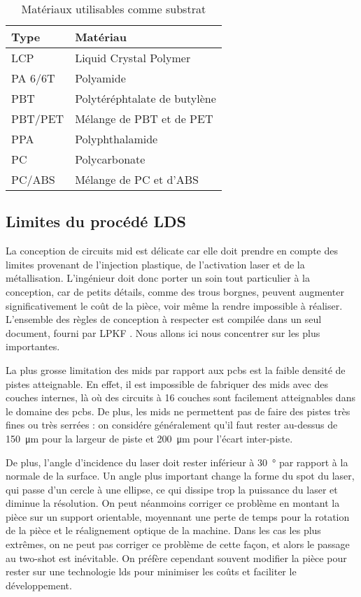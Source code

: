 \begin{table}[h]
\centering
\begin{tabular}{l l}
\toprule 
Type & Matériau \\
\midrule %
LCP & Liquid Crystal Polymer \\
PA 6/6T & Polyamide \\
PBT & Polytéréphtalate de butylène \\
PBT/PET & Mélange de PBT et de PET \\
PPA & Polyphthalamide \\
PC & Polycarbonate \\
PC/ABS & Mélange de PC et d'ABS \\ 
\bottomrule 
\end{tabular}
\caption{Matériaux utilisables comme substrat}
\label{tab:mid-materials}
\end{table}

\subsection{Limites du procédé LDS}
La conception de circuits \gls{mid} est délicate car elle doit prendre en compte des limites provenant de l'injection plastique, de l'activation laser et de la métallisation.
L'ingénieur doit donc porter un soin tout particulier à la conception, car de petits détails, comme des trous borgnes, peuvent augmenter significativement le coût de la pièce, voir même la rendre impossible à réaliser.
L'ensemble des règles de conception à respecter est compilée dans un seul document, fourni par LPKF \cite{mid-design-rules}.
Nous allons ici nous concentrer sur les plus importantes.

La plus grosse limitation des \glspl{mid} par rapport aux \glspl{pcb} est la faible densité de pistes atteignable.
En effet, il est impossible de fabriquer des \glspl{mid} avec des couches internes, là où des circuits à 16 couches sont facilement atteignables dans le domaine des \glspl{pcb}.
De plus, les \glspl{mid} ne permettent pas de faire des pistes très fines ou très serrées : on considére généralement qu'il faut rester au-dessus de \SI{150}{\micro\meter} pour la largeur de piste et \SI{200}{\micro\meter} pour l'écart inter-piste.

De plus, l'angle d'incidence du laser doit rester inférieur à \SI{30}{\degree} par rapport à la normale de la surface.
Un angle plus important change la forme du spot du laser, qui passe d'un cercle à une ellipse, ce qui dissipe trop la puissance du laser et diminue la résolution.
On peut néanmoins corriger ce problème en montant la pièce sur un support orientable, moyennant une perte de temps pour la rotation de la pièce et le réalignement optique de la machine.
Dans les cas les plus extrêmes, on ne peut pas corriger ce problème de cette façon, et alors le passage au two-shot est inévitable.
On préfère cependant souvent modifier la pièce pour rester sur une technologie \gls{lds} pour minimiser les coûts et faciliter le développement.

